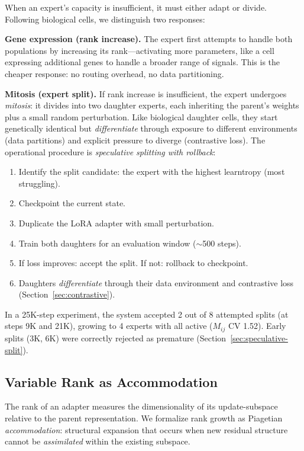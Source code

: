 \documentclass{article}
\begin{document}
When an expert's capacity is insufficient, it must either adapt or divide. Following biological cells, we distinguish two responses:

\textbf{Gene expression (rank increase).} The expert first attempts to handle both populations by increasing its rank---activating more parameters, like a cell expressing additional genes to handle a broader range of signals. This is the cheaper response: no routing overhead, no data partitioning.

\textbf{Mitosis (expert split).} If rank increase is insufficient, the expert undergoes \emph{mitosis}: it divides into two daughter experts, each inheriting the parent's weights plus a small random perturbation. Like biological daughter cells, they start genetically identical but \emph{differentiate} through exposure to different environments (data partitions) and explicit pressure to diverge (contrastive loss). The operational procedure is \emph{speculative splitting with rollback}:
\begin{enumerate}
    \item Identify the split candidate: the expert with the highest learntropy (most struggling).
    \item Checkpoint the current state.
    \item Duplicate the LoRA adapter with small perturbation.
    \item Train both daughters for an evaluation window ($\sim$500 steps).
    \item If loss improves: accept the split. If not: rollback to checkpoint.
    \item Daughters \emph{differentiate} through their data environment and contrastive loss (Section~\ref{sec:contrastive}).
\end{enumerate}
In a 25K-step experiment, the system accepted 2 out of 8 attempted splits (at steps 9K and 21K), growing to 4 experts with all active ($M_{ij}$ CV 1.52). Early splits (3K, 6K) were correctly rejected as premature (Section~\ref{sec:speculative-split}).

\subsection{Variable Rank as Accommodation}

The rank of an adapter measures the dimensionality of its update-subspace
relative to the parent representation. We formalize rank growth as Piagetian
\emph{accommodation}: structural expansion that occurs when new residual
structure cannot be \emph{assimilated} within the existing subspace.
\end{document}
